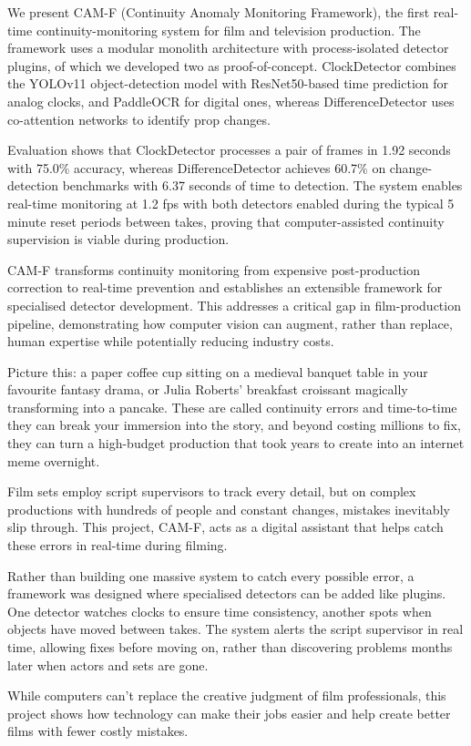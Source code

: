 We present CAM-F (Continuity Anomaly Monitoring Framework), the first real-time continuity-monitoring system for film and television production. The framework uses a modular monolith architecture with process-isolated detector plugins, of which we developed two as proof-of-concept. ClockDetector combines the YOLOv11 object-detection model with ResNet50-based time prediction for analog clocks, and PaddleOCR for digital ones, whereas DifferenceDetector uses co-attention networks to identify prop changes.

Evaluation shows that ClockDetector processes a pair of frames in 1.92 seconds with 75.0\% accuracy, whereas DifferenceDetector achieves 60.7\% on change-detection benchmarks with 6.37 seconds of time to detection. The system enables real-time monitoring at 1.2 fps with both detectors enabled during the typical 5 minute reset periods between takes, proving that computer-assisted continuity supervision is viable during production.

CAM-F transforms continuity monitoring from expensive post-production correction to real-time prevention and establishes an extensible framework for specialised detector development. This addresses a critical gap in film-production pipeline, demonstrating how computer vision can augment, rather than replace, human expertise while potentially reducing industry costs.



Picture this: a paper coffee cup sitting on a medieval banquet table in your favourite fantasy drama, or Julia Roberts' breakfast croissant magically transforming into a pancake. These are called continuity errors and time-to-time they can break your immersion into the story, and beyond costing millions to fix, they can turn a high-budget production that took years to create into an internet meme overnight.

Film sets employ script supervisors to track every detail, but on complex productions with hundreds of people and constant changes, mistakes inevitably slip through. This project, CAM-F, acts as a digital assistant that helps catch these errors in real-time during filming.

Rather than building one massive system to catch every possible error, a framework was designed where specialised detectors can be added like plugins. One detector watches clocks to ensure time consistency, another spots when objects have moved between takes. The system alerts the script supervisor in real time, allowing fixes before moving on, rather than discovering problems months later when actors and sets are gone.

While computers can't replace the creative judgment of film professionals, this project shows how technology can make their jobs easier and help create better films with fewer costly mistakes.